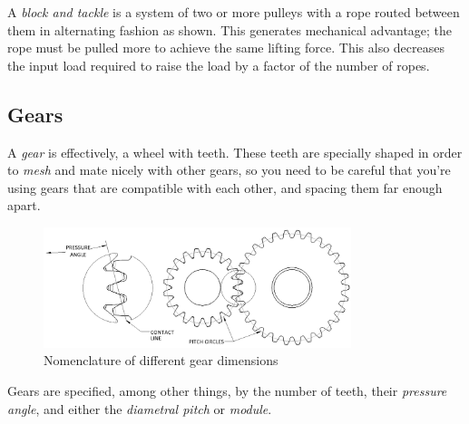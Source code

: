 A \textit{block and tackle} is a system of two or more pulleys with a rope routed between them in alternating fashion as shown. This generates mechanical advantage; the rope must be pulled more to achieve the same lifting force. This also decreases the input load required to raise the load by a factor of the number of ropes. 

\subsection{Gears}

A \textit{gear} is effectively, a wheel with teeth. These teeth are specially shaped in order to \textit{mesh} and mate nicely with other gears, so you need to be careful that you're using gears that are compatible with each other, and spacing them far enough apart.

\begin{figure}[H]
	\includegraphics[width=0.8\textwidth]{imgs/gear_nomenclature.png}
	\caption{Nomenclature of different gear dimensions}
\end{figure}
Gears are specified, among other things, by the number of teeth, their \textit{pressure angle}, and either the \textit{diametral pitch} or \textit{module}.

